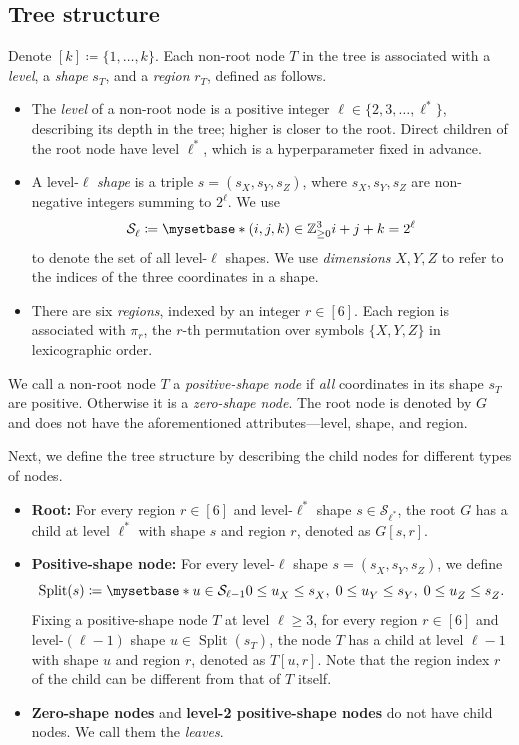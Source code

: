 \documentclass[11pt, a4paper, copyright, gdm]{google}
\theoremstyle{definition}
\theoremstyle{remark}
\theoremstyle{plain}
\DeclareMathOperator{\Split}{Split}
\newcommand{\defn}[1]{{\emph{{#1}}}}
\newcommand{\Shapes}{\mathcal{S}}
\newcommand{\Z}{\mathbb{Z}}
\newcommand{\defeq}{\coloneqq}
\begin{document}
\subsection{Tree structure}
\label{subsec:recursive-tree-structure}
Denote $[k]\defeq\{1,\dots,k\}$.
Each non-root node $T$ in the tree is associated with a \emph{level}, a \emph{shape} $s_T^{}$, and a \emph{region} $r_T^{}$, defined as follows.
\begin{itemize}
  \item The \defn{level} of a non-root node is a positive integer $\ell \in \{2,3,\dots,\ell^*\}$, describing its depth in the tree; higher is closer to the root. Direct children of the root node have level $\ell^*$, which is a hyperparameter fixed in advance.
  \item A level-$\ell$ \defn{shape} is a triple $s = (s_X^{}, s_Y^{}, s_Z^{})$, where $s_X^{}, s_Y^{}, s_Z^{}$ are non-negative integers summing to $2^\ell$. We use
        \[
          \Shapes_\ell^{} \coloneqq \myset*{(i,j,k) \in \Z_{\ge 0}^3}{i+j+k=2^\ell}
        \]
        to denote the set of all level-$\ell$ shapes. We use \defn{dimensions} $X, Y, Z$ to refer to the indices of the three coordinates in a shape.
  \item There are six \defn{regions}, indexed by an integer $r \in [6]$. Each region is associated with $\pi_r$, the $r$-th permutation over symbols $\{X, Y, Z\}$ in lexicographic order.
\end{itemize}
%
We call a non-root node $T$ a \defn{positive-shape node} if \emph{all} coordinates in its shape $s_T^{}$ are positive. Otherwise it is a \defn{zero-shape node}. The root node is denoted by $G$ and does not have the aforementioned attributes---level, shape, and region.

Next, we define the tree structure by describing the child nodes for different types of nodes.

\begin{itemize}
  \item \textbf{Root:} For every region $r \in [6]$ and level-$\ell^*$ shape $s \in \Shapes_{\ell^*}^{}$, the root $G$ has a child at level $\ell^*$ with shape $s$ and region $r$, denoted as $G[s, r]$.
  \item \textbf{Positive-shape node:} For every level-$\ell$ shape $s = (s_X^{}, s_Y^{}, s_Z^{})$, we define
        \[
          \Split(s) \defeq \myset*{u \in \Shapes_{\ell-1}}{0 \le u_X^{} \le s_X^{}, \; 0 \le u_Y^{} \le s_Y^{}, \; 0 \le u_Z^{} \le s_Z^{}}.
        \]
        Fixing a positive-shape node $T$ at level $\ell \ge 3$, for every region $r \in [6]$ and level-$(\ell - 1)$ shape $u \in \Split(s_T^{})$, the node $T$ has a child at level $\ell - 1$ with shape $u$ and region $r$, denoted as $T[u, r]$. Note that the region index $r$ of the child can be different from that of $T$ itself.
  \item \textbf{Zero-shape nodes} and \textbf{level-2 positive-shape nodes} do not have child nodes. We call them the \emph{leaves}.
\end{itemize}
\end{document}
